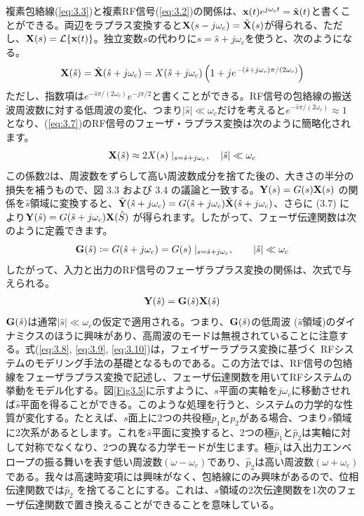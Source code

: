 \documentclass[book]{jlreq}
\begin{document}
複素包絡線(\ref{eq:3.3})と複素RF信号(\ref{eq:3.2})の関係は、$\vb{x}(t) e^{j\omega_c t} = \tilde{\vb{x}}(t)$と書くことができる。両辺をラプラス変換すると$\vb{X}(s-j\omega_c) = \tilde{\vb{X}}(s)$が得られる、ただし、$\vb{X}(s) = \mathcal{L}\{\vb{x}(t)\}$。独立変数$s$の代わりに$s=\hat{s} + j\omega_c$を使うと、次のようになる。
%
\begin{equation}
    \vb{X}(\hat{s})=\tilde{\vb{X}}(\hat{s}+j\omega_c)=X(\hat{s}+j\omega_c)\left (1+j e^{-(\hat{s}+j\omega_c)\pi/(2\omega_c)} \right )
    \label{eq:3.7}
\end{equation}
%
ただし、指数項は$e^{-\hat{s}\pi/(2\omega_c)}e^{-j\pi/2}$と書くことができる。RF信号の包絡線の搬送波周波数に対する低周波の変化、つまり$ |\hat{s}| \ll \omega_c$だけを考えると$e^{-\hat{s}\pi/(2\omega_c)}\approx 1$ となり、(\ref{eq:3.7})のRF信号のフェーザ・ラプラス変換は次のように簡略化されます。
%
\begin{equation}
    \vb{X}(\hat{s}) \approx 2 X(s)\mid_{s=\hat{s}+j\omega_c}, \quad |\hat{s}| \ll \omega_c
    \label{eq:3.8}
\end{equation}
%
この係数2は、周波数をずらして高い周波数成分を捨てた後の、大きさの半分の損失を補うもので、図 3.3 および 3.4 の議論と一致する。$\vb{Y}(s) = G(s)\vb{X}(s)$ の関係を$\hat{s}$領域に変換すると、$\tilde{\vb{Y}}(\hat{s}+j\omega_c) = G(\hat{s}+j\omega_c)\tilde{\vb{X}}(\hat{s}+j\omega_c)$、さらに (3.7) により$\vb{Y}(\hat{s}) = G(\hat{s}+j\omega_c)\vb{X}(\hat{S})$ が得られます。したがって、フェーザ伝達関数は次のように定義できます。
%
\begin{equation}
    \vb{G}(\hat{s}) \coloneqq G(\hat{s}+j\omega_c) = G(s)\mid_{s=\hat{s}+j\omega_c}, \quad \quad |\hat{s}| \ll \omega_c
    \label{eq:3.9}
\end{equation}
%
したがって、入力と出力のRF信号のフェーザラプラス変換の関係は、次式で与えられる。
%
\begin{eqnarray}
    \vb{Y}(\hat{s}) = \vb{G}(\hat{s}) \vb{X}(\hat{s})
    \label{eq:3.10}
\end{eqnarray}
%
$\vb{G}(\hat{s})$は通常$|\hat{s}|\ll \omega_c$の仮定で適用される。つまり、$\vb{G}(\hat{s})$の低周波 ($\hat{s}$領域)のダイナミクスのほうに興味があり、高周波のモードは無視されていることに注意する。式(\ref{eq:3.8}, \ref{eq:3.9}, \ref{eq:3.10})は，フェイザーラプラス変換に基づく RFシステムのモデリング手法の基礎となるものである。この方法では、RF信号の包絡線をフェーザラプラス変換で記述し、フェーザ伝達関数を用いてRFシステムの挙動をモデル化する。図\ref{Fig3.5}に示すように、$s$平面の実軸を$j\omega_c$に移動させれば$\hat{s}$平面を得ることができる。このような処理を行うと、システムの力学的な性質が変化する。たとえば、$s$面上に2つの共役極$p_1$と$p_2$がある場合、つまり$s$領域に2次系があるとします。これを$\hat{s}$平面に変換すると、2つの極$\hat{p}_1$と$\hat{p}_2$は実軸に対して対称でなくなり、2つの異なる力学モードが生じます。極$\hat{p}_1$は入出力エンベロープの振る舞いを表す低い周波数$(\omega - \omega_c)$であり、$\hat{p}_2$は高い周波数$(\omega + \omega_c)$である。我々は高速時変項には興味がなく、包絡線にのみ興味があるので、位相伝達関数では$\hat{p}_2$ を捨てることにする。これは、$s$領域の2次伝達関数を1次のフェーザ伝達関数で置き換えることができることを意味している。
\end{document}
